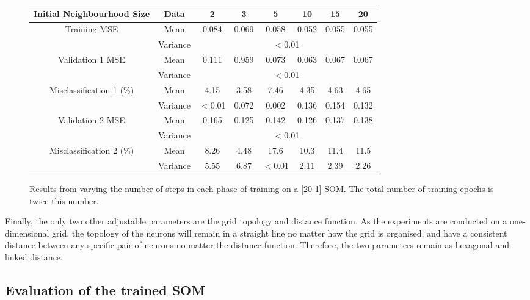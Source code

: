 \documentclass[10pt, oneside]{article}
\begin{document}
\begin{figure}[h]
\begin{center}
\fontsize{9}{11}\selectfont
\begin{tabular}{|*{8}{c|}}
\hline 
Initial Neighbourhood Size & Data & 2 & 3 & 5 & 10 & 15 & 20 \\ \hline
\multirow{2}{*}{Training MSE} & Mean & 0.084 & 0.069 & 0.058 & 0.052 & 0.055 & 0.055 \\ \cline{2-8}
\ & Variance & \multicolumn{6}{c|}{$<$0.01} \\ \hline
\multirow{2}{*}{Validation 1 MSE} & Mean & 0.111 & 0.959 & 0.073 & 0.063 & 0.067 & 0.067 \\ \cline{2-8}
\ & Variance & \multicolumn{6}{c|}{$<$0.01} \\ \hline
\multirow{2}{*}{Misclassification 1 (\%)} & Mean & 4.15 & 3.58 & 7.46 & 4.35 & 4.63 & 4.65 \\ \cline{2-8}
\ & Variance & $<$0.01 & 0.072 & 0.002 & 0.136 & 0.154 & 0.132 \\ \hline
\multirow{2}{*}{Validation 2 MSE} & Mean & 0.165 & 0.125 & 0.142 & 0.126 & 0.137 & 0.138 \\ \cline{2-8}
\ & Variance & \multicolumn{6}{c|}{$<$0.01} \\ \hline
\multirow{2}{*}{Misclassification 2 (\%)} & Mean & 8.26 & 4.48 & 17.6 & 10.3 & 11.4 & 11.5 \\ \cline{2-8}
\ & Variance & 5.55 & 6.87 & $<$0.01 & 2.11 & 2.39 & 2.26 \\ \hline
\end{tabular}
\end{center}
\caption{\label{fig:neighbourhood-testing} Results from varying the number of steps in each phase of training on a [20 1] SOM. The total number of training epochs is twice this number.}
\end{figure}

Finally, the only two other adjustable parameters are the grid topology and distance function. As the experiments are conducted on a one-dimensional grid, the topology of the neurons will remain in a straight line no matter how the grid is organised, and have a consistent distance between any specific pair of neurons no matter the distance function. Therefore, the two parameters remain as hexagonal and linked distance.

\subsection{Evaluation of the trained SOM}
\end{document}
